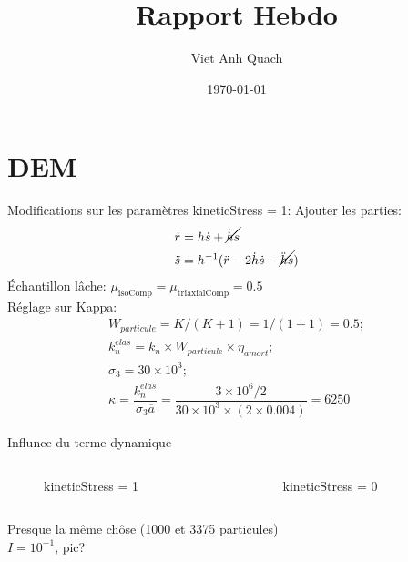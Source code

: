 \documentclass[10pt]{beamer}
\title{Rapport Hebdo}
\author{Viet Anh Quach}
\institute{3SR}
\date{\today}
\begin{document}
\begin{frame}
    \titlepage
\end{frame}


\section{DEM}

\begin{frame}{Modifications sur les paramètres}
    kineticStress = 1: Ajouter les parties:
    \begin{align*}
    \dot{r} &= h\dot{s} + \cancel{\dot{h}s} \\
    \ddot{s} &= h^{-1}(\ddot{r} - 2\dot{h}\dot{s} - \cancel{\ddot{h}s})
    \end{align*}
    Échantillon lâche: $ \mu_{\text{isoComp}} = \mu_{\text{triaxialComp}} = 0.5$ \\
    Réglage sur Kappa:
    \begin{align*}
            W_{particule} = K / (K + 1) = 1 / (1 + 1) = 0.5; \\
            k_n^{elas} = k_n \times W_{particule} \times \eta_{amort}; \\
            \sigma_3 = 30 \times 10^3; \\
    \kappa = \dfrac{k_n^{elas}}{\sigma_3 \overline{a}} = \dfrac{3\times10^{6}/2}{30\times10^{3} \times (2 \times 0.004)} = 6250
\end{align*}

\end{frame}



\begin{frame}{Influnce du terme dynamique}
    \begin{columns}
        \begin{column}{0.5\textwidth}
            \begin{figure}
                \centering
                \scalebox{0.5}{}
                \caption{kineticStress = 1}
            \end{figure}
        \end{column}
        \begin{column}{0.5\textwidth}
            \begin{figure}
                \centering
                \scalebox{0.5}{}
                \caption{kineticStress = 0}
            \end{figure}
        \end{column}
    \end{columns}
    Presque la même chôse (1000 et 3375 particules)\\
    $I = 10^{-1}$, pic?
\end{frame}
\end{document}
